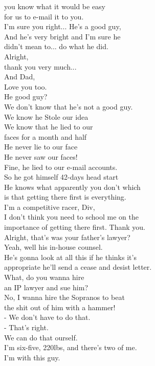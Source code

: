 \documentclass{article}
\begin{document}
\begin{multicols}{3}
you know what it would be easy\\
for us to e-mail it to you.\\
I'm sure you right... He's a good guy,\\
And he's very bright and I'm sure he\\
didn't mean to... do what he did.\\
Alright,\\
thank you very much...\\
And Dad,\\
Love you too.\\
He good guy?\\
We don't know that he's not a good guy.\\
We know he Stole our idea\\
We know that he lied to our\\
faces for a month and half\\
He never lie to our face\\
He never saw our faces!\\
Fine, he lied to our e-mail accounts.\\
So he got himself 42-days head start\\
He knows what apparently you don't which\\
is that getting there first is everything.\\
I'm a competitive racer, Div,\\
I don't think you need to school me on the\\
importance of getting there first. Thank you.\\
Alright, that's was your father's lawyer?\\
Yeah, well his in-house counsel.\\
He's gonna look at all this if he thinks it's\\
appropriate he'll send a cease and desist letter.\\
What, do you wanna hire\\
an IP lawyer and sue him?\\
No, I wanna hire the Sopranos to beat\\
the shit out of him with a hammer!\\
- We don't have to do that.\\
- That's right.\\
We can do that ourself.\\
I'm six-five, 220lbs, and there's two of me.\\
I'm with this guy.\\

\end{multicols}
\end{document}
